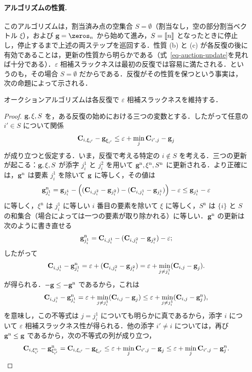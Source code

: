 \paragraph{アルゴリズムの性質.} このアルゴリズムは，割当済み点の空集合 $S=\emptyset$（割当なし，空の部分割当ベクトル $\xi$），および $\gD=\zeros_n$ から始めて進み，$S=\llbracket n\rrbracket$ となったときに停止し，停止するまで上述の両ステップを巡回する．性質 {(b)} と {(c)} が各反復の後に有効であることは，更新の性質から明らかである（式~\eqref{eq-auction-update}を見れば十分である）．$\varepsilon$ 相補スラックネスは最初の反復では容易に満たされる．というのも，その場合 $S=\emptyset$ だからである．反復がその性質を保つという事実は，次の命題によって示される．
\begin{prop} オークションアルゴリズムは各反復で $\varepsilon$ 相補スラックネスを維持する．
\end{prop}
\begin{proof}
	$\mathrm{\textbf{g}},\xi,S$ を，ある反復の始めにおける三つの変数とする．したがって任意の $i'\in S$ について関係
	$$\mathrm{\textbf{C}}_{i,\xi_{i'}} - \mathrm{\textbf{g}}_{\xi_{i'}}  \leq \varepsilon + \min_{j} \mathrm{\textbf{C}}_{{i'},j} - \mathrm{\textbf{g}}_{j} $$
が成り立つと仮定する．いま，反復で考える特定の $i\notin S$ を考える．三つの更新が起こる：$\mathrm{\textbf{g}},\xi,S$ が添字 $j^1_i$ と $j^2_i$ を用いて $\mathrm{\textbf{g}}^{\text{n}},\xi^{\text{n}},S^{\text{n}}$ に更新される．より正確には，$\mathrm{\textbf{g}}^{\text{n}}$ は要素 $j^1_i$ を除いて $\mathrm{\textbf{g}}$ に等しく，その値は
$$\mathrm{\textbf{g}}_{j^1_{i}}^\text{n} = \mathrm{\textbf{g}}_{j^1_{i}} - \left((\mathrm{\textbf{C}}_{i,j^2_{i}}-\mathrm{\textbf{g}}_{j^2_{i}})-(\mathrm{\textbf{C}}_{i,j^1_{i}}-\mathrm{\textbf{g}}_{j^1_{i}})\right)-\varepsilon \leq \mathrm{\textbf{g}}_{j^1_{i}}-\varepsilon$$
に等しく，$\xi^{\text{n}}$ は $j^1_i$ に等しい $i$ 番目の要素を除いて $\xi$ に等しく，$S^{\text{n}}$ は $\{i\}$ と $S$ の和集合（場合によっては一つの要素が取り除かれる）に等しい．$\mathrm{\textbf{g}}^{\text{n}}$ の更新は次のように書き直せる
$$\mathrm{\textbf{g}}^{\text{n}}_{j^1_i}= \mathrm{\textbf{C}}_{i,j^1_{i}} - (\mathrm{\textbf{C}}_{i,j^2_{i}}-\mathrm{\textbf{g}}_{j^2_{i}}) -\varepsilon;$$
したがって
$$\mathrm{\textbf{C}}_{i,j^1_{i}} - \mathrm{\textbf{g}}^{\text{n}}_{j^1_i}=  \varepsilon + (\mathrm{\textbf{C}}_{i,j^2_{i}}-\mathrm{\textbf{g}}_{j^2_{i}}) = \varepsilon+\min_{j\ne j^1_i} (\mathrm{\textbf{C}}_{i,j}-\mathrm{\textbf{g}}_{j}).$$
が得られる．$-\mathrm{\textbf{g}}\leq -\mathrm{\textbf{g}}^{\text{n}}$ であるから，これは
$$\mathrm{\textbf{C}}_{i,j^1_{i}} - \mathrm{\textbf{g}}^{\text{n}}_{j^1_i} = \varepsilon + \min_{j\ne j^1_i} (\mathrm{\textbf{C}}_{i,j}-\mathrm{\textbf{g}}_{j})\leq \varepsilon+\min_{j\ne j^1_i} (\mathrm{\textbf{C}}_{i,j}-\mathrm{\textbf{g}}^{\text{n}}_{j}),$$
を意味し，この不等式は $j=j^1_i$ についても明らかに真であるから，添字 $i$ について $\varepsilon$ 相補スラックネス性が得られる．他の添字 $i'\ne i$ については，再び $\mathrm{\textbf{g}}^{\text{n}}\leq\mathrm{\textbf{g}}$ であるから，次の不等式の列が成り立つ，
$$\mathrm{\textbf{C}}_{i,\xi^{\text{n}}_{i'}} - \mathrm{\textbf{g}}^{\text{n}}_{\xi^{\text{n}}_{i'}} = \mathrm{\textbf{C}}_{i,\xi_{i'}} - \mathrm{\textbf{g}}_{\xi_{i'}} \leq \varepsilon + \min_{j} \mathrm{\textbf{C}}_{{i'},j} - \mathrm{\textbf{g}}_{j} \leq \varepsilon + \min_{j} \mathrm{\textbf{C}}_{{i'},j} - \mathrm{\textbf{g}}^{n}_{j}. $$
\end{proof}

